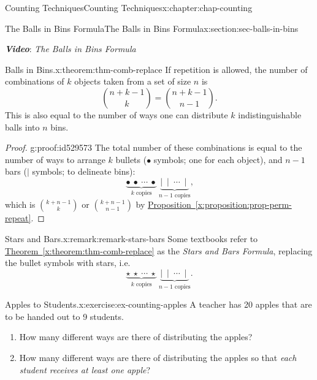 \documentclass[oneside,10pt,]{book}
\newcommand{\xreffont}{\relax}
\newcommand{\alert}[1]{\textbf{\textit{#1}}}
\numberwithin{equation}{section}
\begin{document}
\begin{chapterptx}{Counting Techniques}{}{Counting Techniques}{}{}{x:chapter:chap-counting}
\begin{sectionptx}{The Balls in Bins Formula}{}{The Balls in Bins Formula}{}{}{x:section:sec-balls-in-bins}
\begin{sidebyside}{1}{0}{0}{0}
\begin{sbspanel}{1}
\begin{tcbraster}[raster columns=2, raster column skip=1pt, raster halign=center, raster force size=false, raster left skip=0pt, raster right skip=0pt]
\end{tcbraster}%
\end{sbspanel}%
\end{sidebyside}%
\par
\alert{Video}: \emph{The Balls in Bins Formula}%
\begin{theorem}{Balls in Bins.}{}{x:theorem:thm-comb-replace}%
If repetition is allowed, the number of combinations of \(k\) objects taken from a set of size \(n\) is%
\begin{equation*}
\binom{n+k-1}{k} = \binom{n+k-1}{n-1}\text{.}
\end{equation*}
This is also equal to the number of ways one can distribute \(k\) indistinguishable balls into \(n\) bins.%
\end{theorem}
\begin{proof}{}{g:proof:id529573}
The total number of these combinations is equal to the number of ways to arrange \(k\) bullets (\(\bullet\) symbols; one for each object), and \(n-1\) bars (\(\mid\) symbols; to delineate bins):%
\begin{equation*}
\underbrace{\bullet \ \bullet \ \cdots \ \bullet}_{k \text{ copies}}\ \underbrace{\mid \ \mid \ \cdots \ \mid}_{n-1 \text{ copies}}\text{,}
\end{equation*}
which is \(\displaystyle\binom{k+n-1}{k}\) or \(\binom{k+n-1}{n-1}\) by \hyperref[x:proposition:prop-perm-repeat]{Proposition~{\xreffont\ref{x:proposition:prop-perm-repeat}}}.%
\end{proof}
\begin{remark}{Stars and Bars.}{x:remark:remark-stars-bars}%
Some textbooks refer to \hyperref[x:theorem:thm-comb-replace]{Theorem~{\xreffont\ref{x:theorem:thm-comb-replace}}} as the \emph{Stars and Bars Formula}, replacing the bullet symbols with stars, i.e.\@%
\begin{equation*}
\underbrace{\star \ \star \ \cdots \ \star}_{k \text{ copies}}\ \underbrace{\mid \ \mid \ \cdots \ \mid}_{n-1 \text{ copies}}\text{.}
\end{equation*}
%
\end{remark}
\begin{inlineexercise}{Apples to Students.}{x:exercise:ex-counting-apples}%
A teacher has 20 apples that are to be handed out to 9 students.%
\begin{enumerate}[label=(\alph*)]
\item{}How many different ways are there of distributing the apples?%
\item{}How many different ways are there of distributing the apples so that \emph{each student receives at least one apple}?%

\end{enumerate}
\end{inlineexercise}
\end{sectionptx}
\end{chapterptx}
\end{document}
